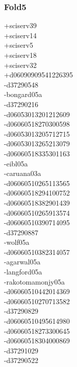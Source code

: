 \begin{multicols}{4}
\subsubsection*{Fold5}
+sciserv39\\
+sciserv14\\
+sciserv5\\
+sciserv18\\
+sciserv32\\
+d06090909541226395\\
-d37290548\\
-bongard05a\\
-d37290216\\
-d06053013201212609\\
-d06060518270300598\\
-d06053013205712715\\
-d06053013265213079\\
-d06060518335301163\\
-eibl05a\\
-caruana03a\\
-d06060510265113565\\
-d06060518294100752\\
-d06060518382901439\\
-d06060510265913574\\
-d06060510390714095\\
-d37290887\\
-wolf05a\\
-d06060510382314057\\
-agarwal05a\\
-langford05a\\
-rakotomamonjy05a\\
-d06060510442014369\\
-d06060510270713582\\
-d37290829\\
-d06060510495614980\\
-d06060518273300645\\
-d06060518304000869\\
-d37291029\\
-d37290522\\

\end{multicols}
